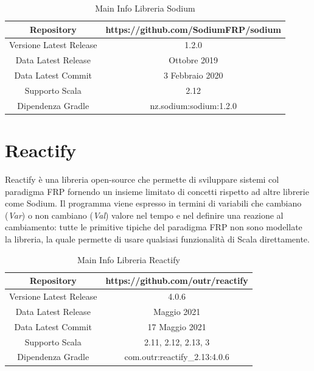 \documentclass[../main.tex]{subfiles}
\begin{document}
\begin{table}[H]
\centering
\begin{tabular}{|c|c|}
     \hline
     Repository & https://github.com/SodiumFRP/sodium \\
     \hline
     Versione Latest Release & 1.2.0 \\
     \hline
     Data Latest Release & Ottobre 2019 \\
     \hline
     Data Latest Commit & 3 Febbraio 2020 \\
     \hline
     Supporto Scala & 2.12 \\
     \hline
     Dipendenza Gradle & nz.sodium:sodium:1.2.0 \\
     \hline
\end{tabular}
\caption{Main Info Libreria Sodium}
\end{table}

\section{Reactify}
Reactify è una libreria open-source che permette di sviluppare sistemi col paradigma FRP fornendo un insieme limitato di concetti rispetto ad altre librerie come Sodium. Il programma viene espresso in termini di variabili che cambiano (\textit{Var}) o non cambiano (\textit{Val}) valore nel tempo e nel definire una reazione al cambiamento: tutte le primitive tipiche del paradigma FRP non sono modellate la libreria, la quale permette di usare qualsiasi funzionalità di Scala direttamente.

\begin{table}[H]
\centering
\begin{tabular}{|c|c|}
     \hline
     Repository & https://github.com/outr/reactify \\
     \hline
     Versione Latest Release & 4.0.6 \\
     \hline
     Data Latest Release & Maggio 2021 \\
     \hline
     Data Latest Commit & 17 Maggio 2021 \\
     \hline
     Supporto Scala & 2.11, 2.12, 2.13, 3 \\
     \hline
     Dipendenza Gradle & com.outr:reactify\_2.13:4.0.6 \\
     \hline
\end{tabular}
\caption{Main Info Libreria Reactify}
\end{table}
\end{document}
